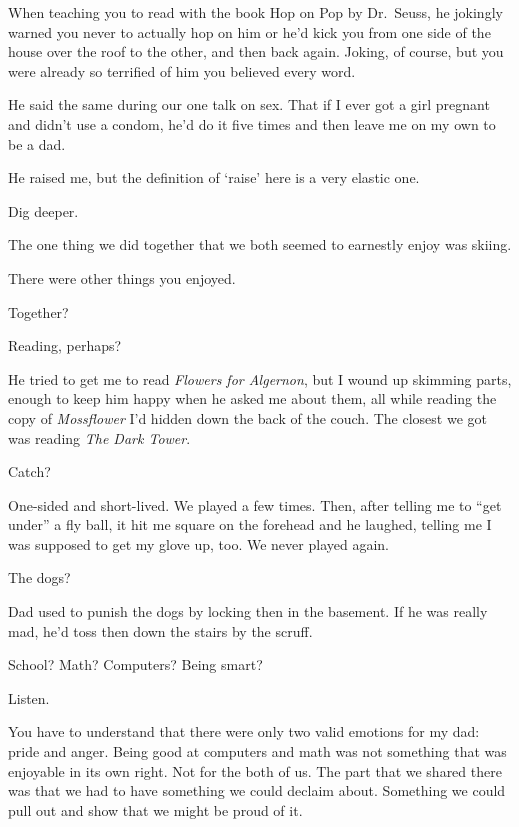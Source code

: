 \begin{paracol}{2}
\begin{leftcolumn}
\begin{ally}
When teaching you to read with the book Hop on Pop by Dr.~Seuss, he jokingly warned you never to actually hop on him or he'd kick you from one side of the house over the roof to the other, and then back again. Joking, of course, but you were already so terrified of him you believed every word.
\end{ally}
He said the same during our one talk on sex. That if I ever got a girl pregnant and didn't use a condom, he'd do it five times and then leave me on my own to be a dad.

He raised me, but the definition of `raise' here is a very elastic one.

\begin{ally}
Dig deeper.
\end{ally}
\newpage

\noindent The one thing we did together that we both seemed to earnestly enjoy was skiing.

\begin{ally}
There were other things you enjoyed.
\end{ally}
Together?

\begin{ally}
Reading, perhaps?
\end{ally}
He tried to get me to read \emph{Flowers for Algernon}, but I wound up skimming parts, enough to keep him happy when he asked me about them, all while reading the copy of \emph{Mossflower} I'd hidden down the back of the couch. The closest we got was reading \emph{The Dark Tower}.

\begin{ally}
Catch?
\end{ally}
One-sided and short-lived. We played a few times. Then, after telling me to ``get under'' a fly ball, it hit me square on the forehead and he laughed, telling me I was supposed to get my glove up, too. We never played again.

\begin{ally}
The dogs?
\end{ally}
Dad used to punish the dogs by locking then in the basement. If he was really mad, he'd toss then down the stairs by the scruff.

\begin{ally}
School? Math? Computers? Being smart?
\end{ally}
Listen.

You have to understand that there were only two valid emotions for my dad: pride and anger. Being good at computers and math was not something that was enjoyable in its own right. Not for the both of us. The part that we shared there was that we had to have something we could declaim about. Something we could pull out and show that we might be proud of it.


\end{leftcolumn}
\end{paracol}
